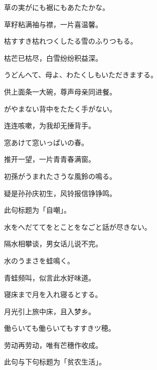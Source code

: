 \begin{haiku}
    {\FH 草の実がにも裾にもあたたかな。}

    {\FK 草籽粘满袖与襟，一片喜温馨。}
\end{haiku}

\begin{haiku}
    {\FH 枯すすき枯れつくしたる雪のふりつもる。}

    {\FK 枯芒已枯尽，白雪纷纷积益深。}
\end{haiku}

\begin{haiku}
    {\FH うどんへて、母よ、わたくしもいただきまする。}

    {\FK 供上面条一大碗，尊声母亲同进餐。}
\end{haiku}

\begin{haiku}
    {\FH {}がやまない背中をたたく手がない。}

    {\FK 连连咳嗽，为我却无捶背手。}
\end{haiku}

\begin{haiku}
    {\FH 窓あけて窓いっぱいの春。}

    {\FK 推开一望，一片青青春满窗。}
\end{haiku}

\begin{haiku}
    {\FH 初孫がうまれたさうな風鈴の鳴る。}

    {\FK 疑是孙孙庆初生，风铃报信铮铮鸣。}

    {\FS 此句标题为「自嘲」。}
\end{haiku}

\begin{haiku}
    {\FH 水をへだててをとことをなごと話が尽きない。}

    {\FK 隔水相攀谈，男女话儿说不完。}
\end{haiku}

\begin{haiku}
    {\FH 水のうまさを蛙鳴く。}

    {\FK 青蛙频叫，似言此水好味道。}
\end{haiku}

\begin{haiku}
    {\FH 寝床まで月を入れ寝るとする。}

    {\FK 月光引上旅中床，且入梦乡。}
\end{haiku}

\begin{haiku}
    {\FH 働らいても働らいてもすすきツ穂。}

    {\FK 劳动再劳动，唯有芒穗作收成。}

    {\FS 此句与下句标题为「贫农生活」。}
\end{haiku}

